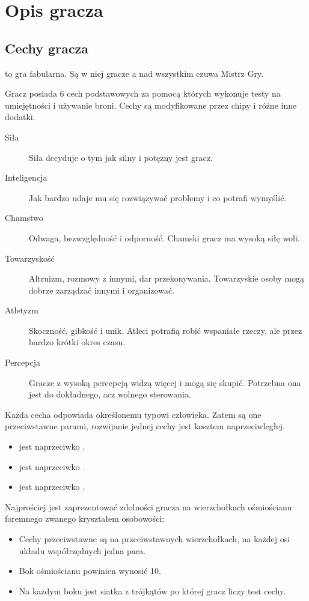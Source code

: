 \chapter{Opis gracza}
\section{Cechy gracza}
\kosmoramus to gra fabularna. Są w niej gracze a nad wszystkim czuwa Mistrz Gry.

Gracz posiada 6 cech podstawowych za pomocą których wykonuje testy na umiejętności i używanie broni.
Cechy są modyfikowane przez chipy i różne inne dodatki.
\begin{description}
 \item[Siła \abs] Siła decyduje o tym jak silny i potężny jest gracz.
 \item[Inteligencja \abi] Jak bardzo udaje mu się rozwiązywać problemy i co potrafi wymyślić.
 \item[Chamstwo \abh] Odwaga, bezwzględność i odporność. Chamski gracz ma wysoką siłę woli.
 \item[Towarzyskość \abt] Altruizm, rozmowy z innymi, dar przekonywania. Towarzyskie osoby mogą dobrze zarządzać innymi i organizować.
 \item[Atletyzm \aba] Skoczność, gibkość i unik. Atleci potrafią robić wspaniałe rzeczy, ale przez bardzo krótki okres czasu.
 \item[Percepcja \abp] Gracze z wysoką percepcją widzą więcej i mogą się skupić. Potrzebna ona jest do dokładnego, acz wolnego sterowania.
\end{description}

Każda cecha odpowiada określonemu typowi człowieka.
Zatem są one przeciwstawne parami, rozwijanie jednej cechy jest kosztem naprzeciwległej.
\begin{itemize}
 \item \abs jest naprzeciwko \abi.
 \item \abh jest naprzeciwko \abt.
 \item \aba jest naprzeciwko \abp.
\end{itemize}

Najprościej jest zaprezentować zdolności gracza na wierzchołkach ośmiościanu foremnego zwanego kryształem osobowości:
\begin{itemize}
 \item Cechy przeciwstawne są na przeciwstawnych wierzchołkach, na każdej osi układu współrzędnych jedna para.
 \item Bok ośmiościanu powinien wynosić 10.
 \item Na każdym boku jest siatka z trójkątów po której gracz liczy test cechy.
\end{itemize}

